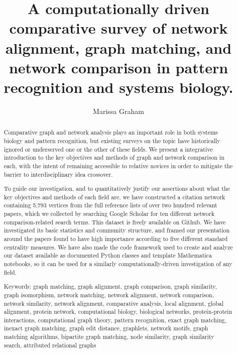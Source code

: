 \documentclass[12pt]{thesis}
\author{Marissa Graham}
\title{A computationally driven comparative survey of network alignment, graph matching, and network comparison in pattern recognition and systems biology.}
\theoremstyle{plain}
\theoremstyle{definition}
\theoremstyle{remark}
\begin{document}








\frontmatter 
\maketitle 

\begin{abstract}

Comparative graph and network analysis plays an important role in both systems biology and pattern recognition, but existing surveys on the topic have historically ignored or underserved one or the other of these fields. We present a integrative introduction to the key objectives and methods of graph and network comparison in each, with the intent of remaining accessible to relative novices in order to mitigate the barrier to interdisciplinary idea crossover.

To guide our investigation, and to quantitatively justify our assertions about what the key objectives and methods of each field are, we have constructed a citation network containing 5,793 vertices from the full reference lists of over two hundred relevant papers, which we collected by searching Google Scholar for ten different network comparison-related search terms. This dataset is freely available on Github. We have investigated its basic statistics and community structure, and framed our presentation around the papers found to have high importance according to five different standard centrality measures. We have also made the code framework used to create and analyze our dataset available as documented Python classes and template Mathematica notebooks, so it can be used for a similarly computationally-driven investigation of any field.

\vskip 2.25in
 
\noindent Keywords: %
graph matching, graph alignment, graph comparison, graph similarity, graph isomorphism, network matching, network alignment, network comparison, network similarity, network alignment, comparative analysis, local alignment, global alignment, protein network, computational biology, biological networks, protein-protein interactions, computational graph theory, pattern recognition, exact graph matching, inexact graph matching, graph edit distance, graphlets, network motifs, graph matching algorithms, bipartite graph matching, node similarity, graph similarity search, attributed relational graphs
\end{abstract}
\end{document}
